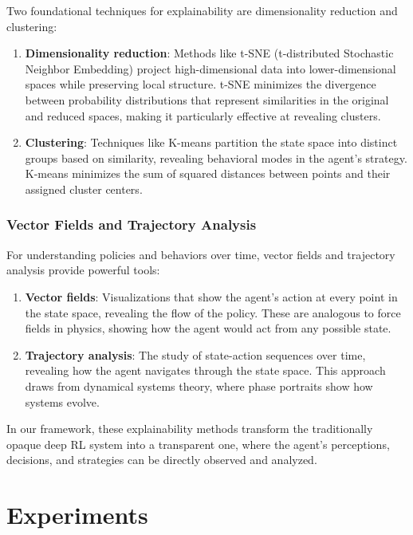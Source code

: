 \documentclass[conference]{IEEEtran}
\begin{document}
Two foundational techniques for explainability are dimensionality reduction and clustering:

\begin{enumerate}[label=\roman*.]
    \item \textbf{Dimensionality reduction}: Methods like t-SNE (t-distributed Stochastic Neighbor Embedding) project high-dimensional data into lower-dimensional spaces while preserving local structure. t-SNE minimizes the divergence between probability distributions that represent similarities in the original and reduced spaces, making it particularly effective at revealing clusters.
    
    \item \textbf{Clustering}: Techniques like K-means partition the state space into distinct groups based on similarity, revealing behavioral modes in the agent's strategy. K-means minimizes the sum of squared distances between points and their assigned cluster centers.
\end{enumerate}

\subsubsection{Vector Fields and Trajectory Analysis}

For understanding policies and behaviors over time, vector fields and trajectory analysis provide powerful tools:

\begin{enumerate}[label=\roman*.]
    \item \textbf{Vector fields}: Visualizations that show the agent's action at every point in the state space, revealing the flow of the policy. These are analogous to force fields in physics, showing how the agent would act from any possible state.
    
    \item \textbf{Trajectory analysis}: The study of state-action sequences over time, revealing how the agent navigates through the state space. This approach draws from dynamical systems theory, where phase portraits show how systems evolve.
\end{enumerate}

In our framework, these explainability methods transform the traditionally opaque deep RL system into a transparent one, where the agent's perceptions, decisions, and strategies can be directly observed and analyzed.

\section{Experiments}
\end{document}
